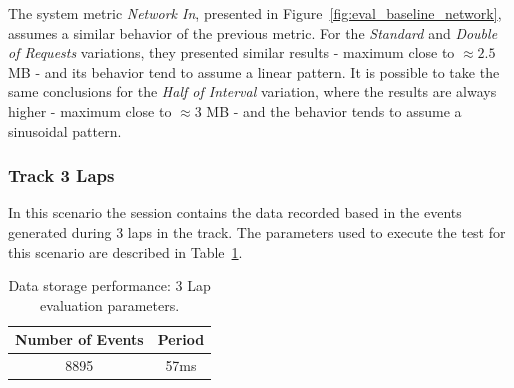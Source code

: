 The system metric \textit{Network In}, presented in Figure~\ref{fig:eval_baseline_network}, assumes a
similar behavior of the previous metric. For the \textit{Standard} and \textit{Double of Requests} variations,
they presented similar results - maximum close to $\approx2.5$ \gls{MB} - and its behavior tend to assume a linear
pattern. It is possible to take the same conclusions for the \textit{Half of Interval} variation,
where the results are always higher - maximum close to $\approx3$ \gls{MB} - and the behavior tends to assume
a sinusoidal pattern.

\subsubsection{Track 3 Laps}
\label{subs:eval_exp_data_3laps}
In this scenario the session contains the data recorded based in the events generated during 3 laps
in the track. The parameters used to execute the test for this scenario are described in
Table~\ref{tab:3laps_parameters}.\\

\begin{table}[ht!]
  \begin{tabular}{|c|c|}
    \hline
    Number of Events & Period \\ \hline
    8895             & 57ms   \\ \hline
  \end{tabular}
  \caption[Data storage: 3 Lap evaluation parameters.]{Data storage performance: 3 Lap evaluation parameters.}
  \label{tab:3laps_parameters}
\end{table}

